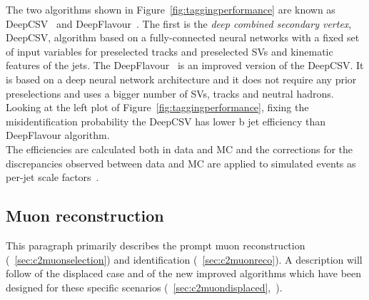 The two algorithms shown in Figure~\ref{fig:taggingperformance} are known as DeepCSV~\cite{csv} and 
DeepFlavour~\cite{deep}. The first is the \emph{deep combined secondary vertex}, DeepCSV,
algorithm based on a fully-connected neural networks with a fixed set
of input variables for preselected tracks and preselected SVs and
kinematic features of the jets. The DeepFlavour~\cite{deep} is an improved
version of the DeepCSV. It is based on a deep neural network
architecture and it does not require any prior preselections and uses
a bigger number of SVs, tracks and neutral hadrons.
Looking at the left plot of Figure~\ref{fig:taggingperformance},
fixing the misidentification probability the DeepCSV has lower b jet
efficiency than DeepFlavour algorithm.\\
The efficiencies are calculated both in data and MC and the
corrections for the discrepancies observed between data and MC are
applied to simulated events as per-jet scale factors~\cite{csv}.


\subsection{Muon reconstruction}\label{sec:trackmuon}
This paragraph primarily describes the prompt muon reconstruction (~\ref{sec:c2muonselection}) and
identification (~\ref{sec:c2muonreco}). A description will follow of the displaced
case and of the new improved algorithms which have been designed for these specific
scenarios (~\ref{sec:c2muondisplaced},~\cite{CMS-DP-2015-015}).

